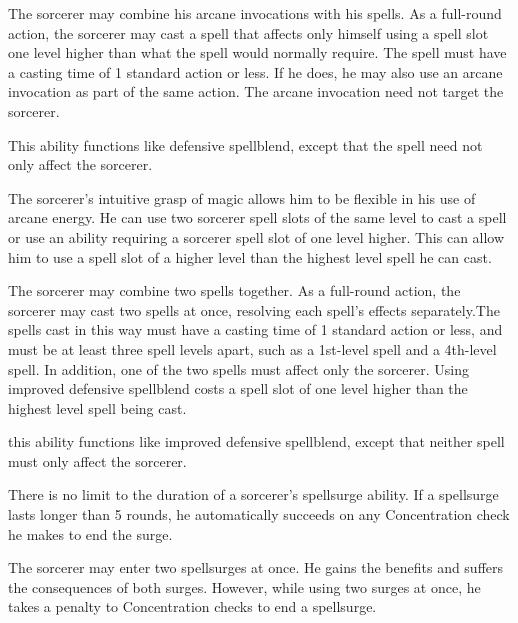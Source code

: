  The sorcerer may combine his arcane invocations with his spells. As a full-round action, the sorcerer may cast a spell that affects only himself using a spell slot one level higher than what the spell would normally require. The spell must have a casting time of 1 standard action or less. If he does, he may also use an arcane invocation as part of the same action. The arcane invocation need not target the sorcerer.

 This ability functions like defensive spellblend, except that the spell need not only affect the sorcerer.

 The sorcerer's intuitive grasp of magic allows him to be flexible in his use of arcane energy. He can use two sorcerer spell slots of the same level to cast a spell or use an ability requiring a sorcerer spell slot of one level higher. This can allow him to use a spell slot of a higher level than the highest level spell he can cast.

 The sorcerer may combine two spells together. As a full-round action, the sorcerer may cast two spells at once, resolving each spell's effects separately.The spells cast in this way must have a casting time of 1 standard action or less, and must be at least three spell levels apart, such as a 1st-level spell and a 4th-level spell. In addition, one of the two spells must affect only the sorcerer. Using improved defensive spellblend costs a spell slot of one level higher than the highest level spell being cast.

 this ability functions like improved defensive spellblend, except that neither spell must only affect the sorcerer.

 There is no limit to the duration of a sorcerer's spellsurge ability. If a spellsurge lasts longer than 5 rounds, he automatically succeeds on any Concentration check he makes to end the surge.

 The sorcerer may enter two spellsurges at once. He gains the benefits and suffers the consequences of both surges. However, while using two surges at once, he takes a  penalty to Concentration checks to end a spellsurge.

